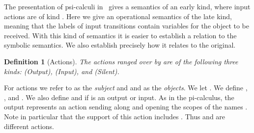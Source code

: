 \documentclass{eptcs}
\newtheorem{definition}{Definition}
\theoremstyle{definition}
\begin{document}
The presentation of psi-calculi in~\cite{bengtson.johansson.ea:psi-calculi} gives a semantics of an early kind, where input actions are of kind . 
Here we give an operational semantics of the late kind, meaning that
the labels of input transitions contain variables for the object to be
received. With this kind of semantics it is easier to establish a
relation to the symbolic semantics. We also establish precisely how it
relates to the original.


\begin{definition}[Actions]

The {\em actions} ranged over by  are of the following three kinds:
 (Output),  (Input), and
 (Silent).





\end{definition}

For actions we refer to  as the {\em subject} and  and  as the {\em
objects}. We let . We define 
, 
, 
and . We also define  and
 if  is an output or input.
As in the pi-calculus, the output  represents an
action sending  along  and opening the scopes of the names . 
Note in particular that the support of this action includes  . Thus 
 and  are different actions.
\end{document}
